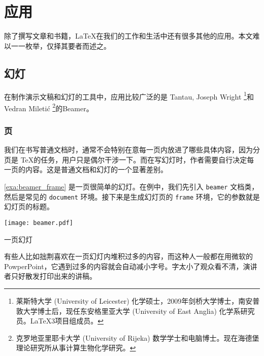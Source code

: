 \chapter{应用}

除了撰写文章和书籍，\LaTeX 在我们的工作和生活中还有很多其他的应用。本文难以一一枚举，仅择其要者而述之。

\section{幻灯}

在制作演示文稿和幻灯的工具中，应用比较广泛的是 Tantau\indexTantau, Joseph Wright\indexWright{} \footnote{莱斯特大学 (University of Leicester) 化学硕士，2009年剑桥大学博士，南安普敦大学博士后，现任东安格里亚大学 (University of East Anglia) 化学系研究员。\LaTeX{}3项目组成员。}和 Vedran Miletić\indexMiletic{} \footnote{克罗地亚里耶卡大学 (University of Rijeka) 数学学士和电脑博士。现在海德堡理论研究所从事计算生物化学研究。}的Beamer\citep{Tantau_beamer}。

\subsection{页}

我们在书写普通文档时，通常不会特别在意每一页内放进了哪些具体内容，因为分页是 \TeX 的任务，用户只是偶尔干涉一下。而在写幻灯时，作者需要自行决定每一页的内容。这是普通文档和幻灯的一个显著差别。

\autoref{exa:beamer_frame} 是一页很简单的幻灯。在例中，我们先引入 \texttt{beamer} 文档类，然后是常见的 \texttt{document} 环境。接下来是生成幻灯页的 \texttt{frame} 环境，它的参数就是幻灯页的标题。


\begin{example}[htbp]
\begin{Demo}
\centering
\texttt{[image: beamer.pdf]}
\end{Demo}
\caption{一页幻灯}
\label{exa:beamer_frame}
\end{example}

有些人比如拙荆喜欢在一页幻灯内堆积过多的内容，而这种人一般都在用微软的 PowperPoint，它遇到过多的内容就会自动减小字号。字太小了观众看不清，演讲者只好散发打印出来的讲稿。

